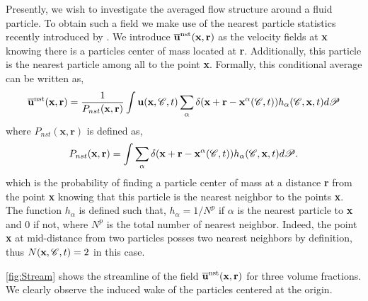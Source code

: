 Presently, we wish to investigate the  averaged flow structure around a fluid particle.
To obtain such a field we make use of the nearest particle statistics recently introduced by \citet{zhang2021stress}. 
We introduce $\overline{\textbf{u}}^\text{nst}(\textbf{x},\textbf{r})$ as the velocity fields at \textbf{x} knowing there is a particles center of mass located at \textbf{r}.
Additionally, this particle is the nearest particle among all to the point \textbf{x}.  
Formally, this conditional average can be written as, 
\begin{equation}
    \overline{\textbf{u}}^\text{nst}(\textbf{x},\textbf{r})=\frac{1}{P_{nst}(\textbf{x},\textbf{r})} 
    \int \textbf{u}(\textbf{x},\mathscr{C},t) 
    \sum_{\alpha}\delta(\textbf{x}+\textbf{r}-\textbf{x}^\alpha(\mathscr{C},t)) h_{\alpha}(\mathscr{C},\textbf{x},t) d\mathscr{P} 
    \label{eq:q_nst_avg}
\end{equation}
where $P_{nst}(\textbf{x},\textbf{r})$ is defined as,  
\begin{equation}
    P_{nst}(\textbf{x},\textbf{r})= 
    \int
    \sum_{\alpha}\delta(\textbf{x}+\textbf{r}-\textbf{x}^\alpha(\mathscr{C},t)) 
    h_\alpha(\mathscr{C},\textbf{x},t) d\mathscr{P}. 
    \label{eq:P_nsti}
\end{equation}
which is the probability of finding a particle center of mass at a distance \textbf{r} from the point \textbf{x} knowing that this particle is the nearest neighbor to the points \textbf{x}. 
The function $h_\alpha$ is defined such that, $h_\alpha = 1/N^p$ if $\alpha$ is the nearest particle to \textbf{x} and $0$ if not, where $N^p$ is the total number of nearest neighbor.
Indeed, the point \textbf{x} at mid-distance from two particles posses two nearest neighbors by definition, thus $N(\textbf{x},\mathscr{C},t) = 2$ in this case. 


\ref{fig:Stream} shows the streamline of the field $\overline{\textbf{u}}^\text{nst}(\textbf{x},\textbf{r})$ for three volume fractions. 
We clearly observe the induced wake of the particles centered at the origin. 


